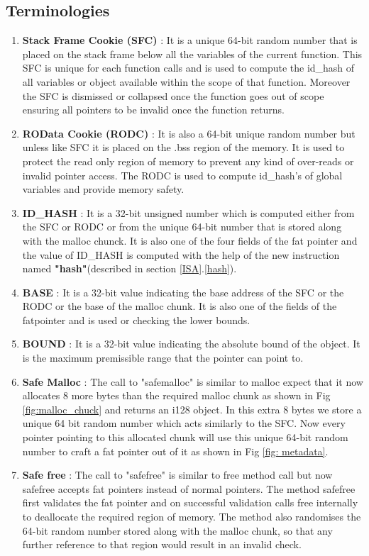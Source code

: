 \subsection{Terminologies}\label{terms}
\begin{enumerate}
    \item \textbf{Stack Frame Cookie (SFC)}\label{SFC} : It is a unique 64-bit random number that is placed on the stack frame below all the variables of the current function. This SFC is unique for each function calls and is used to compute the id\_hash of all variables or object available within the scope of that function. Moreover the SFC is dismissed or collapsed once the function goes out of scope ensuring all pointers to be invalid once the function returns.
    \item \textbf{ROData Cookie (RODC)} : It is also a 64-bit unique random number but unless like SFC it is placed on the .bss region of the memory. It is used to protect the read only region of memory to prevent any kind of over-reads or invalid pointer access. The RODC is used to compute id\_hash's of global variables and provide memory safety.
    \item \textbf{ID\_HASH} : It is a 32-bit unsigned number which is computed either from the SFC or RODC or from the unique 64-bit number that is stored along with the malloc chunck. It is also one of the four fields of the fat pointer and the value of ID\_HASH is computed with the help of the new instruction named \textbf{"hash"}(described in section \ref{ISA}.\ref{hash}).
    \item \textbf{BASE} : It is a 32-bit value indicating the base address of the SFC or the RODC or the base of the malloc chunk. It is also one of the fields of the fatpointer and is used or checking the lower bounds.
    \item \textbf{BOUND} : It is a 32-bit value indicating the absolute bound of the object. It is the maximum premissible range that the pointer can point to. 
    \item \textbf{Safe Malloc}\label{safemalloc} : The call to "safemalloc" is similar to malloc expect that it now allocates 8 more bytes than the required malloc chunk as shown in Fig \ref{fig:malloc_chuck} and returns an i128 object. In this extra 8 bytes we store a unique 64 bit random number which acts similarly to the SFC. Now every pointer pointing to this allocated chunk will use this unique 64-bit random number to craft a fat pointer out of it as shown in Fig \ref{fig: metadata}.
    \item \textbf{Safe free} \label{safefree}: The call to "safefree" is similar to free method call but now safefree accepts fat pointers instead of normal pointers. The method safefree first validates the fat pointer and on successful validation calls free internally to deallocate the required region of memory. The method also randomises the 64-bit random number stored along with the malloc chunk, so that any further reference to that region would result in an invalid check.

\end{enumerate}
